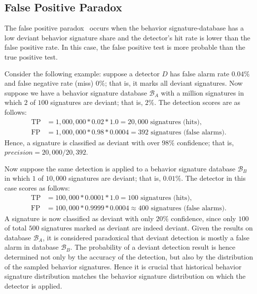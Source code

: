 %
%
\subsection{False Positive Paradox}

The false positive paradox~\citep{Rheinfurth1998} occurs when the behavior signature-database has a low deviant behavior signature share and the detector's hit rate is lower than the false positive rate. In this case, the false positive test is more probable than the true positive test.

Consider the following example:  suppose a detector $D$ has false alarm rate $0.04\%$ and false negative rate (miss) $0\%$; that is, it marks all deviant signatures.  Now suppose we have a behavior signature database $\mathcal{B}_A$ with a million signatures in which $2$ of $100$ signatures are deviant; that is, $2\%$. The detection scores are as follows:
\begin{equation*}
\begin{aligned}
\text{TP} &= 1,000,000 * 0.02 * 1.0 = 20,000 \text{ signatures (hits)},\\
\text{FP} &= 1,000,000 * 0.98 * 0.0004 = 392 \text{ signatures (false alarms)}.
\end{aligned}
\label{eq:paradox-example1}
\end{equation*}
Hence, a signature is classified as deviant with over $98\%$ confidence; that is, $precision=20,000/20,392$.

Now suppose the same detection is applied to a behavior signature database $\mathcal{B}_B$ in which $1$ of $10,000$ signatures are deviant; that is, $0.01\%$. The detector in this case scores as follows:
\begin{equation*}
\begin{aligned}
\text{TP} &= 100,000 * 0.0001 * 1.0 = 100 \text{ signatures (hits)},\\
\text{FP} &= 100,000 * 0.9999 * 0.0004 \approx 400 \text{ signatures (false alarms)}.
\end{aligned}
\label{eq:paradox-example1}
\end{equation*}
A signature is now classified as deviant with only $20\%$ confidence, since only $100$ of total $500$ signatures marked as deviant are indeed deviant. Given the results on database $\mathcal{B}_A$, it is considered paradoxical that deviant detection is mostly a false alarm in database $\mathcal{B}_B$. The probability of a deviant detection result is hence determined not only by the accuracy of the detection, but also by the distribution of the sampled behavior signatures. Hence it is crucial that historical behavior signature distribution matches the behavior signature distribution on which the detector is applied.



